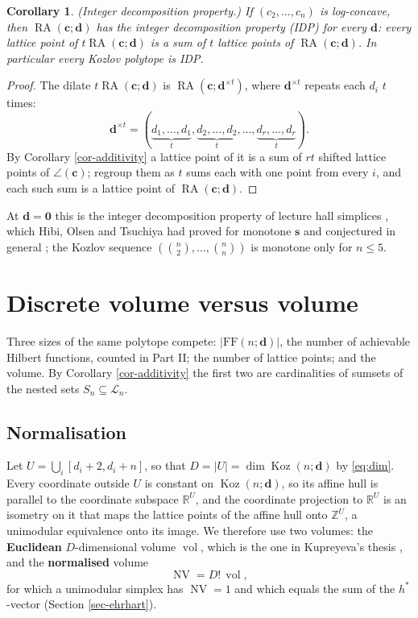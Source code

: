 \documentclass[11pt, a4paper, abstract=yes]{scrartcl}
\theoremstyle{definition}
\theoremstyle{remark}
\theoremstyle{plain}
\newtheorem{corollary}[definition]{Corollary}
\newcommand{\vek}[1]{\boldsymbol{#1}}
\theoremstyle{remark}
\theoremstyle{plain}
\newcommand{\Koz}{\operatorname{Koz}}
\newcommand{\rasimp}{\angle}
\newcommand{\RA}{\operatorname{RA}}
\newcommand{\FF}{\mathrm{FF}}
\newcommand{\NV}{\operatorname{NV}}
\newcommand{\vol}{\operatorname{vol}}
\newcommand{\leandiscof}[1]{\tikz[baseline=-0.6ex]\fill[#1] (0,0) circle (0.6ex);}
\newcommand{\leanfull}{\leandiscof{leanfull}}
\newcommand{\leanmark}[1]{\leavevmode{\reversemarginpar\marginnote{\raggedleft#1}}}
\begin{document}
\begin{corollary}
\leanmark{\leanfull}(\emph{Integer decomposition property.}) If \((c_2,\dots,c_n)\) is log-concave, then
\(\RA(\vek c;\vek d)\) has the integer decomposition property (IDP) for every \(\vek d\): every lattice
point of \(t\RA(\vek c;\vek d)\) is a sum of \(t\) lattice points of \(\RA(\vek c;\vek d)\). In
particular every Kozlov polytope is IDP.
\label{cor-idp}
\end{corollary}

\begin{proof}
The dilate \(t\RA(\vek c;\vek d)\) is \(\RA(\vek c;\vek d^{\times t})\), where \(\vek d^{\times t}\) repeats
each \(d_i\) \(t\) times:
\[
  \vek d^{\times t}=(\underbrace{d_1,\dots,d_1}_{t},\underbrace{d_2,\dots,d_2}_{t},\dots,\underbrace{d_r,\dots,d_r}_{t}).
\]
By Corollary \ref{cor-additivity} a lattice point of it is a sum of \(rt\) shifted
lattice points of \(\rasimp(\vek c)\); regroup them as \(t\) sums each with one point from every
\(i\), and each such sum is a lattice point of \(\RA(\vek c;\vek d)\).
\end{proof}

At \(\vek d=\vek 0\) this is the integer decomposition property of lecture hall simplices
\autocite{BrandenSolus2020}, which Hibi, Olsen and Tsuchiya had proved for monotone \(\vek s\) and
conjectured in general \autocite{HibiOlsenTsuchiya2018}; the Kozlov sequence
\((\binom n2,\dots,\binom nn)\) is monotone only for \(n\le5\).
\section{Discrete volume versus volume}
\label{sec-volume}
Three sizes of the same polytope compete: \(\lvert\FF(n;\vek d)\rvert\), the number of achievable
Hilbert functions, counted in Part II; the number of lattice points; and the volume. By
Corollary \ref{cor-additivity} the first two are cardinalities of sumsets of the nested sets
\(S_n\subseteq\mathcal L_n\).
\subsection{Normalisation}
\label{sec:org5fee90b}

Let \(U=\bigcup_i[d_i+2,d_i+n]\), so that \(D=\lvert U\rvert=\dim\Koz(n;\vek d)\) by \eqref{eq:dim}. Every coordinate outside
\(U\) is constant on \(\Koz(n;\vek d)\), so its affine hull is parallel to the coordinate subspace
\(\mathbb R^U\), and the coordinate projection to \(\mathbb R^U\) is an isometry on it that maps the
lattice points of the affine hull onto \(\mathbb Z^U\), a unimodular equivalence onto its image. We
therefore use two volumes: the \textbf{Euclidean} \(D\)-dimensional volume \(\vol\), which is the one in
Kupreyeva's thesis \autocite{Kupreyeva2019}, and the \textbf{normalised} volume
\begin{equation}\label{eq:NV}
  \NV=D!\,\vol ,
\end{equation}
for which a unimodular simplex has \(\NV=1\) and which equals the sum of the \(h^*\)-vector
(Section \ref{sec-ehrhart}).
\end{document}
